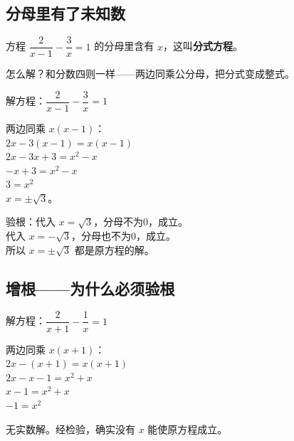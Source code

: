 

\subsection*{分母里有了未知数}

方程 $\dfrac{2}{x-1} - \dfrac{3}{x} = 1$ 的分母里含有 $x$，这叫\textbf{分式方程}。

怎么解？和分数四则一样——两边同乘公分母，把分式变成整式。

\begin{example}
解方程：$\dfrac{2}{x-1} - \dfrac{3}{x} = 1$
\end{example}
\begin{solution}
两边同乘 $x(x-1)$：\\
$2x - 3(x-1) = x(x-1)$\\
$2x - 3x + 3 = x^2 - x$\\
$-x + 3 = x^2 - x$\\
$3 = x^2$\\
$x = \pm\sqrt{3}$。

验根：代入 $x=\sqrt{3}$，分母不为0，成立。\\
代入 $x=-\sqrt{3}$，分母也不为0，成立。\\
所以 $x = \pm\sqrt{3}$ 都是原方程的解。
\end{solution}

\subsection*{增根——为什么必须验根}


\begin{example}
解方程：$\dfrac{2}{x+1} - \dfrac{1}{x} = 1$
\end{example}
\begin{solution}
两边同乘 $x(x+1)$：\\
$2x - (x+1) = x(x+1)$\\
$2x - x - 1 = x^2 + x$\\
$x - 1 = x^2 + x$\\
$-1 = x^2$

无实数解。经检验，确实没有 $x$ 能使原方程成立。
\end{solution}


